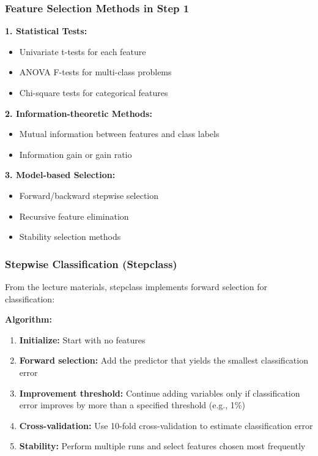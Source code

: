 \documentclass[12pt,a4paper]{article}
\begin{document}
\subsubsection{Feature Selection Methods in Step 1}

\textbf{1. Statistical Tests:}
\begin{itemize}
    \item Univariate t-tests for each feature
    \item ANOVA F-tests for multi-class problems
    \item Chi-square tests for categorical features
\end{itemize}

\textbf{2. Information-theoretic Methods:}
\begin{itemize}
    \item Mutual information between features and class labels
    \item Information gain or gain ratio
\end{itemize}

\textbf{3. Model-based Selection:}
\begin{itemize}
    \item Forward/backward stepwise selection
    \item Recursive feature elimination
    \item Stability selection methods
\end{itemize}

\subsubsection{Stepwise Classification (Stepclass)}

From the lecture materials, stepclass implements forward selection for classification:

\textbf{Algorithm:}
\begin{enumerate}
    \item \textbf{Initialize:} Start with no features
    \item \textbf{Forward selection:} Add the predictor that yields the smallest classification error
    \item \textbf{Improvement threshold:} Continue adding variables only if classification error improves by more than a specified threshold (e.g., 1\%)
    \item \textbf{Cross-validation:} Use 10-fold cross-validation to estimate classification error
    \item \textbf{Stability:} Perform multiple runs and select features chosen most frequently
\end{enumerate}
\end{document}

